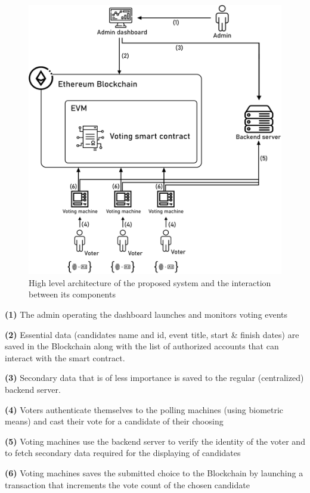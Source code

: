\begin{figure}[H]
	\centering
		\includegraphics[width=12cm]{images/chapter3/architecture.png}
		\caption{{\footnotesize High level architecture of the proposed system and the interaction between its components}}
\end{figure}

\begin{list}{}{}
\item \textbf{(1)} The admin operating the dashboard launches and monitors voting events
\item \textbf{(2)} Essential data (candidates name and id, event title, start \& finish dates) are saved in the Blockchain along with the list of authorized accounts that can interact with the smart contract.
\item \textbf{(3)} Secondary data that is of less importance is saved to the regular (centralized) backend server.
\item \textbf{(4)} Voters authenticate themselves to the polling machines (using biometric means) and cast their vote for a candidate of their choosing
\item \textbf{(5)} Voting machines use the backend server to verify the identity of the voter and to fetch secondary data required for the displaying of candidates
\item \textbf{(6)} Voting machines saves the submitted choice to the Blockchain by launching a transaction that increments the vote count of the chosen candidate
\end{list}

